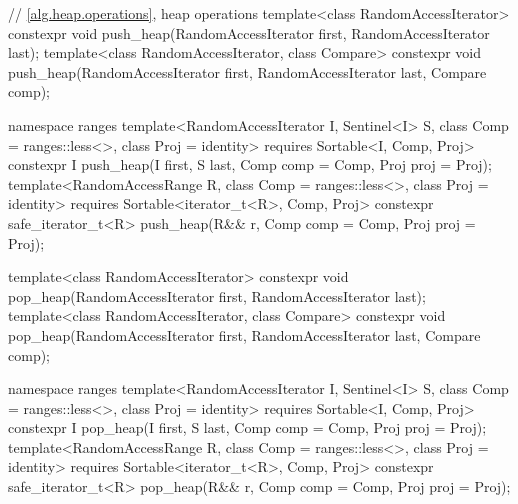 \begin{codeblock}
  // \ref{alg.heap.operations}, heap operations
  template<class RandomAccessIterator>
    constexpr void push_heap(RandomAccessIterator first, RandomAccessIterator last);
  template<class RandomAccessIterator, class Compare>
    constexpr void push_heap(RandomAccessIterator first, RandomAccessIterator last,
                             Compare comp);
\end{codeblock}\begin{addedblock}\begin{codeblock}
  namespace ranges {
    template<RandomAccessIterator I, Sentinel<I> S, class Comp = ranges::less<>,
        class Proj = identity>
      requires Sortable<I, Comp, Proj>
      constexpr I
        push_heap(I first, S last, Comp comp = Comp{}, Proj proj = Proj{});
    template<RandomAccessRange R, class Comp = ranges::less<>, class Proj = identity>
      requires Sortable<iterator_t<R>, Comp, Proj>
      constexpr safe_iterator_t<R>
        push_heap(R&& r, Comp comp = Comp{}, Proj proj = Proj{});
  }
\end{codeblock}\end{addedblock}\begin{codeblock}

  template<class RandomAccessIterator>
    constexpr void pop_heap(RandomAccessIterator first, RandomAccessIterator last);
  template<class RandomAccessIterator, class Compare>
    constexpr void pop_heap(RandomAccessIterator first, RandomAccessIterator last,
                            Compare comp);
\end{codeblock}\begin{addedblock}\begin{codeblock}
  namespace ranges {
    template<RandomAccessIterator I, Sentinel<I> S, class Comp = ranges::less<>,
        class Proj = identity>
      requires Sortable<I, Comp, Proj>
      constexpr I
        pop_heap(I first, S last, Comp comp = Comp{}, Proj proj = Proj{});
    template<RandomAccessRange R, class Comp = ranges::less<>, class Proj = identity>
      requires Sortable<iterator_t<R>, Comp, Proj>
      constexpr safe_iterator_t<R>
        pop_heap(R&& r, Comp comp = Comp{}, Proj proj = Proj{});
  }
\end{codeblock}\end{addedblock}\begin{codeblock}


\end{codeblock}
